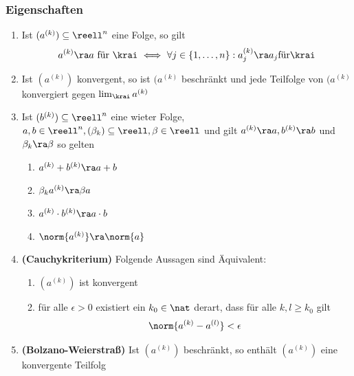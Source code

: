 \documentclass{kit}
\begin{document}
    \subsubsection{Eigenschaften} 
      \begin{enumerate}
        \item Ist $(a^{(k)})\subseteq\reell^n$ eine Folge, so gilt
          $$a^{(k)}\ra a\text{ für }\krai\ \Longleftrightarrow\ \forall j\in\{1,\dots,n\}:a_j^{(k)}\ra a_j\text{für}\krai$$
        \item Ist $(a^{(k)})$ konvergent, so ist $(a^{(k)}$ beschränkt und jede Teilfolge von $(a^{(k)}$ konvergiert gegen
          $\lim_\krai a^{(k)}$
        \item Ist $(b^{(k)})\subseteq\reell^n$ eine wieter Folge, $a,b\in\reell^n,(\beta_k)\subseteq\reell,\beta\in\reell$
          und gilt $a^{(k)}\ra a,b^{(k)}\ra b$ und $\beta_k\ra\beta$ so gelten
          \begin{enumerate}[label=\roman*)]
            \item $a^{(k)}+b^{(k)}\ra a+b$
            \item $\beta_ka^{(k)}\ra\beta a$
            \item $a^{(k)}\cdot b^{(k)}\ra a\cdot b$
            \item $\norm{a^{(k)}}\ra\norm{a}$
          \end{enumerate}
        \item \textbf{(Cauchykriterium)} Folgende Aussagen sind Äquivalent:
          \begin{enumerate}[label=\roman*)]
            \item $(a^{(k)})$ ist konvergent
            \item für alle $\epsilon>0$ existiert ein $k_0\in\nat$ derart, dass für alle $k,l\ge k_0$ gilt
              $$\norm{a^{(k)}-a^{(l)}}<\epsilon$$
          \end{enumerate}
        \item \textbf{(Bolzano-Weierstraß)} Ist $(a^{(k)})$ beschränkt, so enthält $(a^{(k)})$ eine konvergente Teilfolg
      \end{enumerate}
\end{document}
